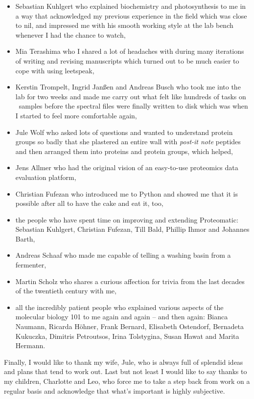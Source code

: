 \begin{itemize}
\item
Sebastian Kuhlgert who explained biochemistry and photosynthesis to me in a 
way that acknowledged my previous experience in the field which was close to 
nil, and impressed me with his smooth working style at the lab bench
whenever I had the chance to watch,

\item
Mia Terashima who I shared a lot of headaches with during many iterations of 
writing and revising manuscripts which turned out to be much easier to cope
with using leetspeak,

\item
Kerstin Trompelt, Ingrid Janßen and Andreas Busch who took me into the lab for
two weeks and made me carry out what felt like hundreds of tasks on \cre~samples 
before the spectral files were finally written to disk which was when I started
to feel more comfortable again,

\item
Jule Wolf who asked lots of questions and wanted to understand protein groups so 
badly that she plastered an entire wall with {\em post-it note} peptides and then
arranged them into proteins and protein groups, which helped,

\item
Jens Allmer who had the original vision of an easy-to-use proteomics data evaluation 
platform,

\item Christian Fufezan who introduced me to Python and showed me that it is possible 
after all to have the cake and eat it, too,

\item
the people who have spent time on improving and extending Proteomatic:
Sebastian Kuhlgert, Christian Fufezan, Till Bald, Phillip Ihmor and Johannes Barth,

\item
Andreas Schaaf who made me 
capable of telling a washing basin from a fermenter,

\item
Martin Scholz who shares a curious affection for trivia from the last decades of 
the twentieth century with me,

\item
all the incredibly patient people who explained various aspects of the molecular 
biology 101 to me again and again -- and then again:
Bianca Naumann, 
Ricarda Höhner,
Frank Bernard,
Elisabeth Ostendorf,
Bernadeta Kukuczka,
Dimitris Petroutsos,
Irina Tolstygina,
Susan Hawat and
Marita Hermann.

\end{itemize}

Finally, I would like to thank my wife, Jule, who is always full of splendid ideas
and plans that tend to work out.
Last but not least I would like to say thanks to my children, Charlotte and Leo, 
who force me to take a step back from work on a regular basis and acknowledge that 
what's important is highly subjective.
